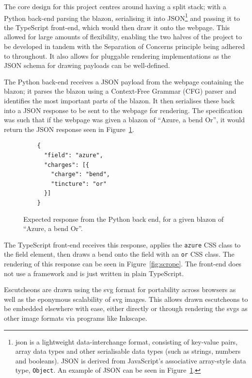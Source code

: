 \documentclass[nobib, a4paper, twoside, justified]{tufte-book}
\makeatletter
\newcommand{\svg}{\gls{svg}\@\xspace}
\newcommand{\svgs}{\glspl{svg}\@\xspace}
\newcommand{\blazon}{\gls{blazon}\@\xspace}
\newcommand{\payload}{\gls{payload}\@\xspace}
\newcommand{\payloads}{\glspl{payload}\@\xspace}
\makeatother
\begin{document}
The core design for this project centres around having a split stack; with a Python back-end
parsing the \blazon, serialising it into JSON\footnote{\gls{json} is a lightweight data-interchange
  format, consisting of key-value pairs, array data types and other serialisable data types (such
  as strings, numbers and booleans). JSON is derived from JavaScript's associative array-style data
type, \texttt{Object}. An example of JSON can be seen in Figure~\ref{fig:expected_output}.} and
passing it to the TypeScript front-end, which would then draw it onto the webpage. This allowed for
large amounts of flexibility, enabling the two halves of the project to be developed in tandem with
the Separation of Concerns principle being adhered to throughout. It also allows for pluggable
rendering implementations as the JSON schema for drawing \payloads can be well-defined.

The Python back-end receives a JSON \payload from the webpage containing the \blazon; it parses the
\blazon using a Context-Free Grammar (CFG) parser and identifies the most important parts of the
\blazon. It then serialises these back into a JSON response to be sent to the webpage for rendering.
The specification was such that if the webpage was given a \blazon of ``Azure, a bend Or'', it would
return the JSON response seen in Figure~\ref{fig:expected_output}.

\begin{figure}[h]
  \begin{verbatim}
    {
      "field": "azure",
      "charges": [{
        "charge": "bend",
        "tincture": "or"
      }]
    }
  \end{verbatim}
  \caption{Expected response from the Python back end, for a given \blazon of ``Azure, a bend Or''.}%
  \label{fig:expected_output}
\end{figure}

The TypeScript front-end receives this response, applies the \texttt{azure} CSS class to the field
element, then draws a bend onto the field with an \texttt{or} CSS class. The rendering of this
response can be seen in Figure~\ref{fig:scrope}. The front-end does not use a framework and is just
written in plain TypeScript.

Escutcheons are drawn using the \svg format for portability across browsers as well as the
eponymous scalability of \svg images. This allows drawn escutcheons to be embedded elsewhere with
ease, either directly or through rendering the \svgs as other image formats via programs like
Inkscape.
\end{document}
